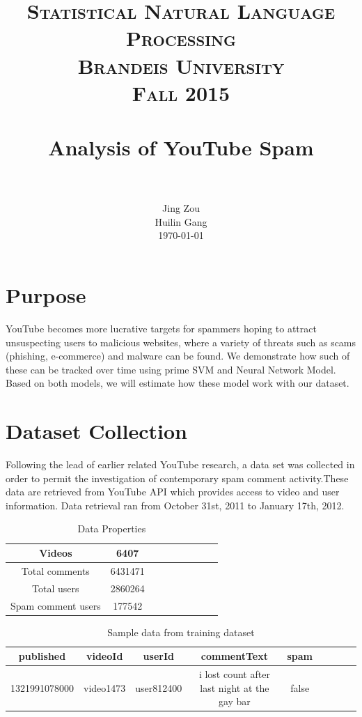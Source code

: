 \documentclass [a4paper, 11pt, oneside, final]{article}
\title{
		\usefont{OT1}{bch}{b}{n}
		\normalfont \Large \textsc{Statistical Natural Language Processing}\\ \textsc{Brandeis University} \\ \textsc{Fall 2015}  \\[25pt]
		\horrule{0.5pt} \\[0.4cm]
		\huge Analysis of YouTube Spam\\
		\horrule{2pt} \\[0.5cm]
}
\author{
	\normalfont 								
	\normalsize
        Jing Zou\\Huilin Gang \\
	\normalsize        
	\today
}
\date{}
\numberwithin{equation}{section}		%
\numberwithin{figure}{section}			%
\numberwithin{table}{section}				%
\begin{document}
\maketitle

\newpage

\section{Purpose}
YouTube becomes more lucrative targets for spammers hoping to attract unsuspecting users to malicious websites, where a variety of threats such as scams (phishing, e-commerce) and malware can be found. We demonstrate how such of these can be tracked over time using prime SVM and Neural Network Model. Based on both models, we will estimate how these model work with our dataset. 
\section{Dataset Collection}
Following the lead of earlier related YouTube research, a data set was collected in order to permit the investigation of contemporary spam comment activity.These data are retrieved from YouTube API which provides access to video and user information. Data retrieval ran from October 31st, 2011 to January 17th, 2012.\\

\begin{table}[h!]
  \begin{center}
    \caption{Data Properties}
    \label{tab:table1}
    \begin{tabular}{ccccccccc}
    \\
    \hline
      Videos & 6407\\
      \hline
     Total comments & 6431471 \\
      \hline
      Total users & 2860264  \\
       \hline  
     Spam comment users & 177542 \\
      \hline
    \end{tabular}
  \end{center}
\end{table}

\begin{table}[h!]
  \begin{center}
    \caption{Sample data from training dataset}
    \label{tab:table1}
    \begin{tabular}{ccccccccc}
    \\
    \hline
      published & videoId & userId & commentText & spam\\
      \hline
     1321991078000 & video1473 & user812400 & i lost count after last night at the gay bar & false \\
    \end{tabular}
  \end{center}
\end{table}
\end{document}
